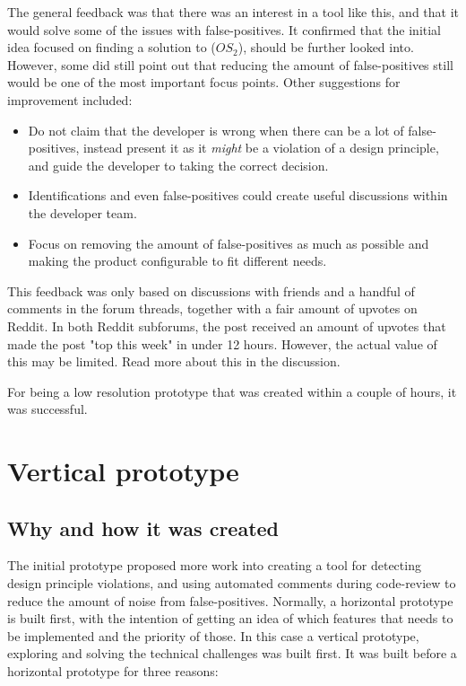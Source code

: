 \documentclass[pdftex,10pt,b5paper,twoside]{report}
\begin{document}
The general feedback was that there was an interest in a tool like this, and that it would solve some of the issues with false-positives. It confirmed that the initial idea focused on finding a solution to (\(OS_{2}\)), should be further looked into. However, some did still point out that reducing the amount of false-positives still would be one of the most important focus points. Other suggestions for improvement included: 
\begin{itemize}
    \item Do not claim that the developer is wrong when there can be a lot of false-positives, instead present it as it \textit{might} be a violation of a design principle, and guide the developer to taking the correct decision.
    \item Identifications and even false-positives could create useful discussions within the developer team.
    \item Focus on removing the amount of false-positives as much as possible and making the product configurable to fit different needs.
  
\end{itemize}

This feedback was only based on discussions with friends and a handful of comments in the forum threads, together with a fair amount of upvotes on Reddit. In both Reddit subforums, the post received an amount of upvotes that made the post "top this week" in under 12 hours. However, the actual value of this may be limited. Read more about this in the discussion. 

For being a low resolution prototype that was created within a couple of hours, it was successful.

\section{Vertical prototype}
\label{vertical-prototype}
\subsection*{Why and how it was created}
The initial prototype proposed more work into creating a tool for detecting design principle violations, and using automated comments during code-review to reduce the amount of noise from false-positives. Normally, a horizontal prototype is built first, with the intention of getting an idea of which features that needs to be implemented and the priority of those. In this case a vertical prototype, exploring and solving the technical challenges was built first. It was built before a horizontal prototype for three reasons:
\end{document}
